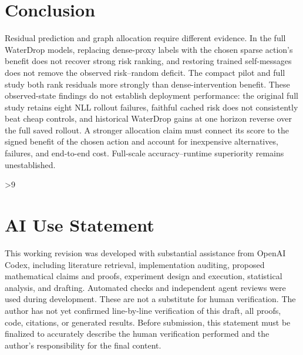 \section{Conclusion}
Residual prediction and graph allocation require different evidence. In the full WaterDrop models, replacing dense-proxy labels with the chosen sparse action's benefit does not recover strong risk ranking, and restoring trained self-messages does not remove the observed risk--random deficit. The compact pilot and full study both rank residuals more strongly than dense-intervention benefit. These observed-state findings do not establish deployment performance: the original full study retains eight NLL rollout failures, faithful cached risk does not consistently beat cheap controls, and historical WaterDrop gains at one horizon reverse over the full saved rollout. A stronger allocation claim must connect its score to the signed benefit of the chosen action and account for inexpensive alternatives, failures, and end-to-end cost. Full-scale accuracy--runtime superiority remains unestablished.

\clearpage
{}
\ifnum\value{page}>9
  \PackageError{research-revision}{Main text exceeds the eight-page limit}{Shorten the main text before submission.}
\fi
\section*{AI Use Statement}
This working revision was developed with substantial assistance from OpenAI Codex, including literature retrieval, implementation auditing, proposed mathematical claims and proofs, experiment design and execution, statistical analysis, and drafting. Automated checks and independent agent reviews were used during development. These are not a substitute for human verification. The author has not yet confirmed line-by-line verification of this draft, all proofs, code, citations, or generated results. Before submission, this statement must be finalized to accurately describe the human verification performed and the author's responsibility for the final content.

